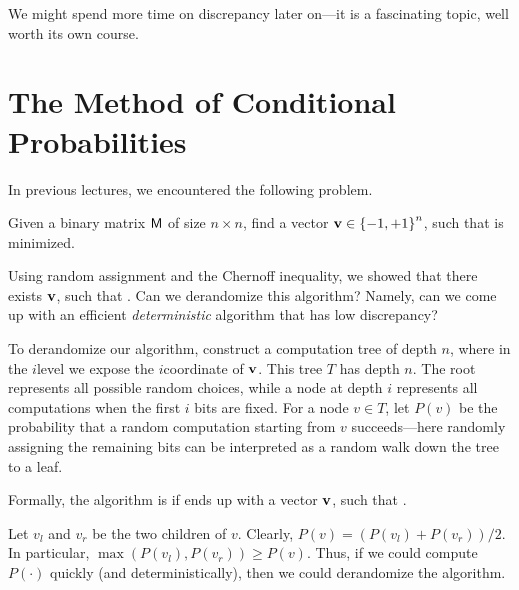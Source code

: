 We might spend more time on discrepancy later on---it is a
fascinating topic, well worth its own course.



\section{The Method of Conditional Probabilities}

In previous lectures, we encountered the following problem.

\begin{problem}
    Given a binary matrix $\mathsf{M}$ of size $n \times n$, find a
    vector $\mathbf{v} \in \left\{ {-1,+1} \right\}^n$, such that
    \chgY{$\dist{\Matrix \vecA}_\infty$}{$\norm{\Matrix \vecA}_\infty$} is minimized.
\end{problem}

Using random assignment and the Chernoff inequality, we showed that
there exists $\mathbf{v}$, such that
. Can we
derandomize this algorithm?  Namely, can we come up with an efficient
\emph{deterministic} algorithm that has low discrepancy?

To derandomize our algorithm, construct a computation tree of depth
$n$, where in the $i$\th level we expose the $i$\th coordinate of
$\mathbf{v}$.  This tree $T$ has depth $n$. The root represents all
possible random choices, while a node at depth $i$ represents all
computations when the first $i$ bits are fixed. For a node $v \in T$,
let $P(v)$ be the probability that a random computation starting from
$v$ succeeds---here randomly assigning the remaining bits can be
interpreted as a random walk down the tree to a leaf.

Formally, the algorithm is  if  ends up with a vector
$\mathbf{v}$, such that
.

Let $v_l$ and $v_r$ be the two children of $v$.
Clearly, $P(v) = (P(v_l) + P(v_r))/2$. In particular, $\max( P(v_l),
P(v_r)) \geq P(v)$. Thus, if we could compute $P(\cdot)$ quickly (and
deterministically), then we could derandomize the algorithm.%


